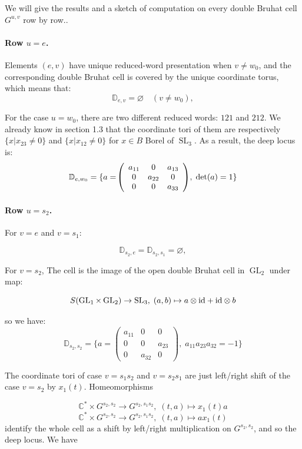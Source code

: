 \documentclass[12pt]{amsart}
\newcommand{\C}{\mathbb C}
\newcommand{\D}{\mathbb D}
\newcommand{\SL}{\operatorname{SL}}
\newcommand{\GL}{\operatorname{GL}}
\theoremstyle{plain}
\theoremstyle{definition}
\theoremstyle{remark}
\begin{document}
We will give the results and a sketch of computation on every double Bruhat cell $G^{u,v}$ row by row..

\bigskip

\paragraph{\bf Row \(u=e\).} Elements $(e, v)$ have unique reduced-word presentation when $v\neq w_0$, and the corresponding double Bruhat cell is covered by the unique coordinate torus, which means that:
\[
\D_{e,v}=\varnothing\quad(v\neq w_0),
\]

For the case $u=w_0$, there are two different reduced words: $121$ and $212$. We already know in section 1.3 that the coordinate tori of them are respectively $\{x|x_{23}\neq 0\}$ and $\{x|x_{12}\neq 0\}$ for $x\in B$ Borel of $\SL_3$. As a result, the deep locus is: 
\[
\D_{e,w_0}
=\{a=\!\left(
\begin{array}{ccc}
a_{11}&0&a_{13}\\
0&a_{22}&0\\
0&0&a_{33}
\end{array}
\right)\!,\; \textup{det}(a)=1 \}
\]

\paragraph{\bf Row \(u=s_2\).} For $v=e$ and $v=s_1$:


\[
\D_{s_2,e}=\D_{s_2,s_1}=\varnothing,
\]

For $v=s_2$, The cell is the image of the open double Bruhat cell in $\GL_2$ under map:

\[
S(\GL_1 \times \GL_2) \to \SL_3, \; (a,b) \mapsto a\otimes \textup{id} + \textup{id}\otimes b
\]

so we have:
\[
\D_{s_2,s_2}
=\{a=\!\left(
\begin{array}{ccc}
a_{11}&0&0\\
0&0&a_{23}\\
0&a_{32}&0
\end{array}
\right)\!,\; a_{11}a_{23}a_{32}=-1\}
\]


The coordinate tori of case $v=s_1s_2$ and $v=s_2s_1$ are just left/right shift of the case $v=s_2$ by $x_1(t)$. Homeomorphisms

$$\C^* \times G^{s_2,s_2}\to G^{s_2,s_1s_2},\; (t,a) \mapsto x_1(t)a$$
$$\C^* \times G^{s_2,s_2}\to G^{s_2,s_1s_2},\; (t,a) \mapsto a x_1(t)$$
identify the whole cell as a shift by left/right multiplication on $G^{s_2,s_2}$, and so the deep locus. We have
\end{document}
